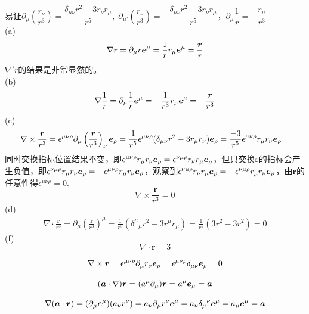 \documentclass{mynote}
\begin{document}
\begin{solution}
    易证$\partial_{\mu} \left( \dfrac{r_{\nu}}{r^3} \right) = \dfrac{\delta_{\mu \nu} r^2 - 3r_{\nu}r_{\mu}}{r^5},\; \partial_{\mu '} \left( \dfrac{r_{\nu}}{r^3} \right) = -\dfrac{\delta_{\mu \nu} r^2 - 3r_{\nu}r_{\mu}}{r^5}$，$\partial_{\mu} \dfrac{1}{r} = - \dfrac{r_{\mu}}{r^3}$\\
    (a) 
    \[
    \nabla r = \partial_{\mu} r \boldsymbol{e}^{\mu} = \frac{1}{r} r_{\mu} \boldsymbol{e}^{\mu} = \frac{\boldsymbol{r}}{r} 
    \]
    $\nabla' r$的结果是非常显然的。\\
    (b)
    \[
    \nabla \frac{1}{r} = \partial_{\mu} \frac{1}{r} \boldsymbol{e}^{\mu} = -\frac{1}{r^3} r_{\mu}\boldsymbol{e}^{\mu} = -\frac{\boldsymbol{r}}{r^3}
    \]
    (c)
    \begin{align*}
        \nabla \times \frac{\boldsymbol{r}}{r^3} &= \epsilon^{\mu \nu \rho} \partial_{\mu} \left( \frac{\boldsymbol{r}}{r^3} \right)_{\nu} \boldsymbol{e}_{\rho} = \frac{1}{r^5} \epsilon^{\mu \nu \rho} (\delta_{\mu \nu}r^2 - 3r_{\mu}r_{\nu})\boldsymbol{e}_{\rho} = \frac{-3}{r^5} \epsilon^{\mu \nu \rho} r_{\mu} r_{\nu} \boldsymbol{e}_{\rho}
    \end{align*}
   同时交换指标位置结果不变，即$\epsilon^{\mu \nu \rho} r_{\mu} r_{\nu} \boldsymbol{e}_{\rho} = \epsilon^{\nu \mu \rho} r_{\nu} r_{\mu} \boldsymbol{e}_{\rho}$，但只交换$\varepsilon$的指标会产生负值，即$\epsilon^{\nu \mu \rho} r_{\mu} r_{\nu} \boldsymbol{e}_{\rho} = - \epsilon^{\mu \nu \rho} r_{\mu} r_{\nu} \boldsymbol{e}_{\rho}$，观察到$\epsilon^{\nu \mu \rho} r_{\nu} r_{\mu} \boldsymbol{e}_{\rho} = - \epsilon^{\nu \mu \rho} r_{\mu} r_{\nu} \boldsymbol{e}_{\rho}$，由$\bm{r}$的任意性得$\epsilon^{\mu \nu \rho} = 0$.
    \[
      \nabla \times \frac{\bm{r}}{r^3} = 0
    \]
    (d)
    \begin{align*}
        \nabla \cdot \frac{\bm{r}}{r^3} = \partial_{\mu} \left( \frac{\bm{r}}{r^3} \right)^{\mu} = \frac{1}{r^5} ({\delta^{\mu}}_{\mu} r^2 - 3r^{\mu} r_{\mu}) =  \frac{1}{r^5} (3r^2 - 3r^2)=0
    \end{align*}
    (f)\\
    \[
        \nabla \cdot \bm{r} = 3
    \] 

    \[
        \nabla \times \boldsymbol{r} = \epsilon^{\mu \nu \rho} \partial_{\mu} r_{\nu} \boldsymbol{e}_{\rho} = \epsilon^{\mu \nu \rho} \delta_{\mu \nu} \boldsymbol{e}_{\rho} = 0
    \]

    \[
        (\boldsymbol{a} \cdot \nabla)\boldsymbol{r} = (a^{\mu} \partial_{\mu})\boldsymbol{r} = a^{\mu}\boldsymbol{e}_{\mu} = \boldsymbol{a}
    \]

    \[
        \nabla(\boldsymbol{a} \cdot \boldsymbol{r}) = (\partial_{\mu} \boldsymbol{e}^{\mu}) (a_{\nu} r^{\nu}) = a_{\nu}\partial_{\mu} r^{\nu} \boldsymbol{e}^{\mu} = a_{\nu}{\delta_{\mu}}^{\nu} \boldsymbol{e}^{\mu} = a_{\mu} \boldsymbol{e}^{\mu} = \boldsymbol{a}
    \]


\end{solution}
\end{document}
